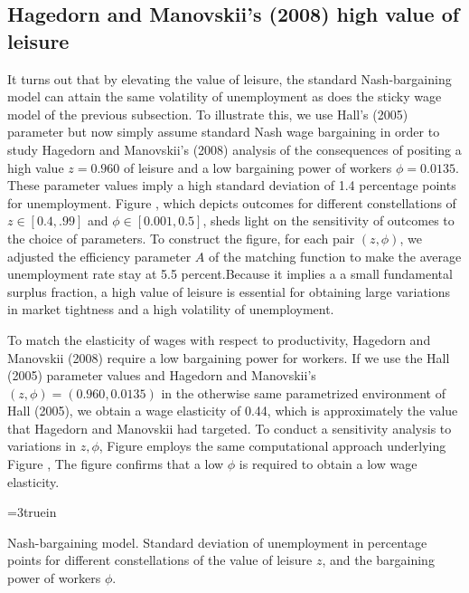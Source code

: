 \subsection{Hagedorn and Manovskii's (2008) high value of leisure}
           \label{sec:FS_HagMan_simul}%
 It turns out that  by elevating the value of
leisure, 
the standard Nash-bargaining model can attain the
same volatility of unemployment as does the sticky wage model of the previous subsection.
To illustrate this, we use  Hall's (2005) parameter but
now simply assume standard Nash wage bargaining in order to study
 Hagedorn and Manovskii's (2008) analysis of the consequences of
  positing a high value $z=0.960$ of leisure  and a low
bargaining power of workers  $\phi=0.0135$.
These parameter values imply a
high standard deviation of 1.4 percentage points for unemployment.
Figure , which depicts outcomes for different
constellations of $z\in [0.4, .99]$ and $\phi\in[0.001, 0.5]$, sheds light
 on the sensitivity of outcomes to  the choice of parameters.
To construct the figure, for each pair $(z,\phi)$, we adjusted the efficiency parameter $A$
of the matching function to make the average unemployment rate stay at
5.5 percent.Because it implies a
a small fundamental surplus fraction, a high value of leisure is essential for obtaining large variations in market tightness and a high volatility of unemployment.



To match the elasticity of wages with respect to productivity,
Hagedorn and Manovskii (2008) require a low bargaining power for workers.
If we use the Hall (2005) parameter values and Hagedorn and Manovskii's
$(z,\phi)=(0.960, 0.0135)$ in the otherwise same  parametrized
environment of Hall (2005), we obtain a  wage elasticity
of 0.44, which  is approximately the value that 
Hagedorn and Manovskii had targeted. To conduct a sensitivity analysis to variations in $z, \phi$,
Figure 
employs   the same computational approach underlying Figure ,
  The figure confirms
that  a low $\phi$ is required to obtain a low wage
elasticity.

\centerline{\epsfxsize=3truein}
\caption{Nash-bargaining model. Standard deviation of unemployment in
percentage points for different
constellations of the value of leisure $z$, and the bargaining
power of workers $\phi$.}
\endfigure

